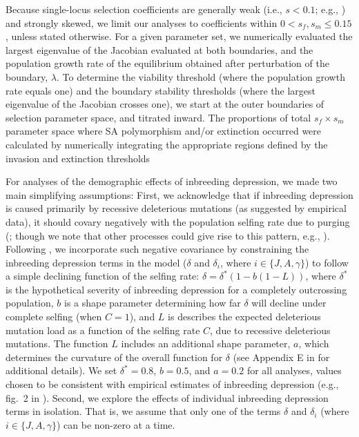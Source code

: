 \documentclass[11pt]{article}
\begin{document}
Because single-locus selection coefficients are generally weak (i.e., $s < 0.1$; e.g., \citealt{Eyre-WalkerKeightly2007}) and strongly skewed, we limit our analyses to coefficients within $0 < s_f,s_m \leq 0.15$, unless stated otherwise. For a given parameter set, we numerically evaluated the largest eigenvalue of the Jacobian evaluated at both boundaries, and the population growth rate of the equilibrium obtained after perturbation of the boundary, $\lambda$. To determine the viability threshold (where the population growth rate equals one) and the boundary stability thresholds (where the largest eigenvalue of the Jacobian crosses one), we start at the outer boundaries of selection parameter space, and titrated inward. The proportions of total $s_f \times s_m$ parameter space where SA polymorphism and/or extinction occurred were calculated by numerically integrating the appropriate regions defined by the invasion and extinction thresholds

For analyses of the demographic effects of inbreeding depression, we made two main simplifying assumptions: First, we acknowledge that if inbreeding depression is caused primarily by recessive deleterious mutations (as suggested by empirical data), it should covary negatively with the population selfing rate due to purging (\citealt{Charlesworth2009}; though we note that other processes could give rise to this pattern, e.g., \citealt{CrnokrakBarrett2002, Charlesworth2009,HedrickGarcia-Dorado2016}). Following \citet{Olito2019}, we incorporate such negative covariance by constraining the inbreeding depression terms in the model ($\delta$ and $\delta_i$, where $i \in \{J,A,\gamma\}$) to follow a simple declining function of the selfing rate: $\delta = \delta^{\ast} (1 - b (1 - L))$, where $\delta^{\ast}$ is the hypothetical severity of inbreeding depression for a completely outcrossing population, $b$ is a shape parameter determining how far $\delta$ will decline under complete selfing (when $C = 1$), and $L$ is describes the expected deleterious mutation load as a function of the selfing rate $C$, due to recessive deleterious mutations. The function $L$ includes an additional shape parameter, $a$, which determines the curvature of the overall function for $\delta$ (see Appendix E in \citealt{Olito2019} for additional details). We set $\delta^{\ast} = 0.8$, $b = 0.5$, and $a = 0.2$ for all analyses, values chosen to be consistent with empirical estimates of inbreeding depression (e.g., fig.~2 in \citealt{HusbandSchemske1996}). Second, we explore the effects of individual inbreeding depression terms in isolation. That is, we assume that only one of the terms $\delta$ and $\delta_i$ (where $i \in \{J,A,\gamma\}$) can be non-zero at a time. 
\end{document}
